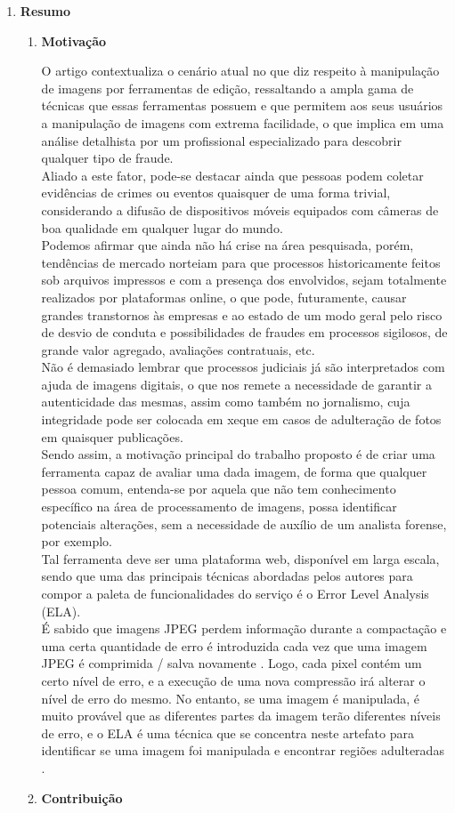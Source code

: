 \begin{enumerate}
  \item \textbf{Resumo}
    \begin{enumerate}[label*=\arabic*.]
      \item \textbf{Motivação}

O artigo contextualiza o cenário atual no que diz respeito à manipulação de imagens por ferramentas de edição, ressaltando a ampla gama de técnicas que essas ferramentas possuem e que permitem aos seus usuários a manipulação de imagens com extrema facilidade, o que implica em uma análise detalhista por um profissional especializado para descobrir qualquer tipo de fraude.
\\[6pt]
Aliado a este fator, pode-se destacar ainda que pessoas podem coletar evidências de crimes ou eventos quaisquer de uma forma trivial, considerando a difusão de dispositivos móveis equipados com câmeras de boa qualidade em qualquer lugar do mundo.
\\[6pt]
Podemos afirmar que ainda não há crise na área pesquisada, porém, tendências de mercado norteiam para que processos historicamente feitos sob arquivos impressos e com a presença dos envolvidos, sejam totalmente realizados por plataformas online, o que pode, futuramente, causar grandes transtornos às empresas e ao estado de um modo geral pelo risco de desvio de conduta e possibilidades de fraudes em processos sigilosos, de grande valor agregado, avaliações contratuais, etc.
\\[6pt]
Não é demasiado lembrar que processos judiciais já são interpretados com ajuda de imagens digitais, o que nos remete a necessidade de garantir a autenticidade das mesmas, assim como também no jornalismo, cuja integridade pode ser colocada em xeque em casos de adulteração de fotos em quaisquer publicações.
\\[6pt]
Sendo assim, a motivação principal do trabalho proposto é de criar uma ferramenta capaz de avaliar uma dada imagem, de forma que qualquer pessoa comum, entenda-se por aquela que não tem conhecimento específico na área de processamento de imagens, possa identificar potenciais alterações, sem a necessidade de auxílio de um analista forense, por exemplo.
\\[6pt]
Tal ferramenta deve ser uma plataforma web, disponível em larga escala, sendo que uma das principais técnicas abordadas pelos autores para compor a paleta de funcionalidades do serviço é o Error Level Analysis (ELA).
\\[6pt]
É sabido que imagens JPEG perdem informação durante a compactação e uma certa quantidade de erro é introduzida cada vez que uma imagem JPEG é comprimida / salva novamente \cite{krawetz}. Logo, cada pixel contém um certo nível de erro, e a execução de uma nova compressão irá alterar o nível de erro do mesmo. No entanto, se uma imagem é manipulada, é muito provável que as diferentes partes da imagem terão diferentes níveis de erro, e o ELA é uma técnica que se concentra neste artefato para identificar se uma imagem foi manipulada e encontrar regiões adulteradas \cite{krawetz}.
\\[6pt]
\item \textbf{Contribuição}


\end{enumerate}
\end{enumerate}
